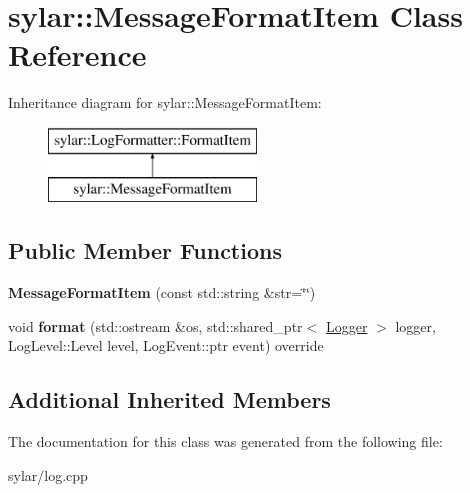 \hypertarget{classsylar_1_1MessageFormatItem}{\section{sylar\-:\-:Message\-Format\-Item Class Reference}
\label{classsylar_1_1MessageFormatItem}
}
Inheritance diagram for sylar\-:\-:Message\-Format\-Item\-:\begin{figure}[H]
\begin{center}
\leavevmode
\includegraphics[height=2.000000cm]{classsylar_1_1MessageFormatItem}
\end{center}
\end{figure}
\subsection*{Public Member Functions}
\begin{DoxyCompactItemize}
\item 
\hypertarget{classsylar_1_1MessageFormatItem_a36e393e1115f7e9d3e1e30ba4dd61c16}{{\bfseries Message\-Format\-Item} (const std\-::string \&str=\char`\"{}\char`\"{})}\label{classsylar_1_1MessageFormatItem_a36e393e1115f7e9d3e1e30ba4dd61c16}

\item 
\hypertarget{classsylar_1_1MessageFormatItem_a29ff61811c7bada5f47aa72f72994044}{void {\bfseries format} (std\-::ostream \&os, std\-::shared\-\_\-ptr$<$ \hyperlink{classsylar_1_1Logger}{Logger} $>$ logger, Log\-Level\-::\-Level level, Log\-Event\-::ptr event) override}\label{classsylar_1_1MessageFormatItem_a29ff61811c7bada5f47aa72f72994044}

\end{DoxyCompactItemize}
\subsection*{Additional Inherited Members}


The documentation for this class was generated from the following file\-:\begin{DoxyCompactItemize}
\item 
sylar/log.\-cpp\end{DoxyCompactItemize}
